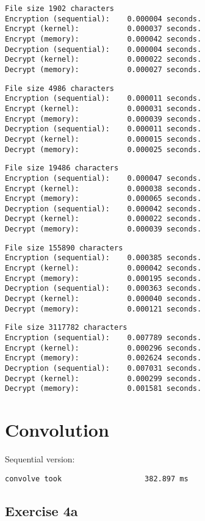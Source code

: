 \documentclass[a4paper]{article}
\begin{document}
\begin{verbatim}
File size 1902 characters
Encryption (sequential):    0.000004 seconds.
Encrypt (kernel):           0.000037 seconds.
Encrypt (memory):           0.000042 seconds.
Decryption (sequential):    0.000004 seconds.
Decrypt (kernel):           0.000022 seconds.
Decrypt (memory):           0.000027 seconds.
\end{verbatim}
\begin{verbatim}
File size 4986 characters
Encryption (sequential):    0.000011 seconds.
Encrypt (kernel):           0.000031 seconds.
Encrypt (memory):           0.000039 seconds.
Decryption (sequential):    0.000011 seconds.
Decrypt (kernel):           0.000015 seconds.
Decrypt (memory):           0.000025 seconds.
\end{verbatim}
\begin{verbatim}
File size 19486 characters
Encryption (sequential):    0.000047 seconds.
Encrypt (kernel):           0.000038 seconds.
Encrypt (memory):           0.000065 seconds.
Decryption (sequential):    0.000042 seconds.
Decrypt (kernel):           0.000022 seconds.
Decrypt (memory):           0.000039 seconds.
\end{verbatim}
\begin{verbatim}
File size 155890 characters
Encryption (sequential):    0.000385 seconds.
Encrypt (kernel):           0.000042 seconds.
Encrypt (memory):           0.000195 seconds.
Decryption (sequential):    0.000363 seconds.
Decrypt (kernel):           0.000040 seconds.
Decrypt (memory):           0.000121 seconds.
\end{verbatim}
\begin{verbatim}
File size 3117782 characters
Encryption (sequential):    0.007789 seconds.
Encrypt (kernel):           0.000296 seconds.
Encrypt (memory):           0.002624 seconds.
Decryption (sequential):    0.007031 seconds.
Decrypt (kernel):           0.000299 seconds.
Decrypt (memory):           0.001581 seconds.
\end{verbatim}

\section{Convolution}

Sequential version:

\begin{verbatim}
convolve took                   382.897 ms
\end{verbatim}

\subsection{Exercise 4a}
\end{document}
